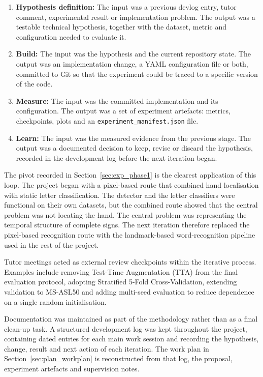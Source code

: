 \begin{enumerate}
    \item \textbf{Hypothesis definition:} The input was a previous devlog entry, tutor comment,
          experimental result or implementation problem. The output was a testable technical
          hypothesis, together with the dataset, metric and configuration needed to evaluate it.
    \item \textbf{Build:} The input was the hypothesis and the current repository state. The output
          was an implementation change, a YAML configuration file or both, committed to Git so that
          the experiment could be traced to a specific version of the code.
    \item \textbf{Measure:} The input was the committed implementation and its configuration. The
          output was a set of experiment artefacts: metrics, checkpoints, plots and an
          \texttt{experiment\_manifest.json} file.
    \item \textbf{Learn:} The input was the measured evidence from the previous stage. The output
          was a documented decision to keep, revise or discard the hypothesis, recorded in the
          development log before the next iteration began.
\end{enumerate}

The pivot recorded in Section~\ref{sec:exp_phase1} is the clearest application of this loop. The
project began with a pixel-based route that combined hand localisation with static letter
classification. The detector and the letter classifiers were functional on their own datasets, but
the combined route showed that the central problem was not locating the hand. The central problem
was representing the temporal structure of complete signs. The next iteration therefore replaced
the pixel-based recognition route with the landmark-based word-recognition pipeline used in the
rest of the project.

Tutor meetings acted as external review checkpoints within the iterative process. Examples include
removing Test-Time Augmentation (TTA) from the final evaluation protocol, adopting Stratified
5-Fold Cross-Validation, extending validation to MS-ASL50 and adding multi-seed evaluation to
reduce dependence on a single random initialisation.

Documentation was maintained as part of the methodology rather than as a final clean-up task. A
structured development log was kept throughout the project, containing dated entries for each main
work session and recording the hypothesis, change, result and next action of each iteration. The
work plan in Section~\ref{sec:plan_workplan} is reconstructed from that log, the proposal,
experiment artefacts and supervision notes.

